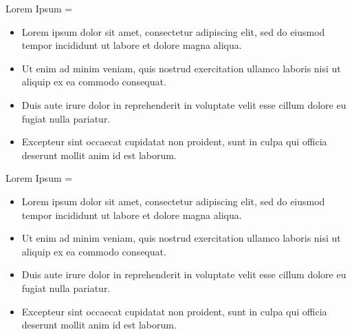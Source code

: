 \documentclass[final,hyperref={pdfpagelabels=false}]{beamer}
\newcommand{\correctitemizeindent}{\setlength{\leftmargini}{2.5em}}
\begin{document}
\begin{frame}
\begin{columns}[T]
\begin{column}{.32\textwidth}
\begin{minipage}[t]{.95\textwidth}
{			\vfill

				
				
			\begin{rightColumnBlock}{Lorem Ipsum}
			\rightskip=\leftskip
			{\correctitemizeindent
			\begin{itemize}
				\item Lorem ipsum dolor sit amet, consectetur adipiscing elit, sed do eiusmod tempor incididunt ut labore et dolore magna aliqua.
				\item Ut enim ad minim veniam, quis nostrud exercitation ullamco laboris nisi ut aliquip ex ea commodo consequat.
				\item Duis aute irure dolor in reprehenderit in voluptate velit esse cillum dolore eu fugiat nulla pariatur.
				\item Excepteur sint occaecat cupidatat non proident, sunt in culpa qui officia deserunt mollit anim id est laborum.
			\end{itemize}
			}
			\end{rightColumnBlock}
			
			\vfill

        	\begin{rightColumnBlock}{Lorem Ipsum}
			\rightskip=\leftskip
			{\correctitemizeindent
			\begin{itemize}
				\item Lorem ipsum dolor sit amet, consectetur adipiscing elit, sed do eiusmod tempor incididunt ut labore et dolore magna aliqua.
				\item Ut enim ad minim veniam, quis nostrud exercitation ullamco laboris nisi ut aliquip ex ea commodo consequat.
				\item Duis aute irure dolor in reprehenderit in voluptate velit esse cillum dolore eu fugiat nulla pariatur.
				\item Excepteur sint occaecat cupidatat non proident, sunt in culpa qui officia deserunt mollit anim id est laborum.
			\end{itemize}
			}
			\end{rightColumnBlock}   
				
			}
			\end{minipage}
		\end{column}
	
			\end{columns}
			
		
\end{frame}
\end{document}
